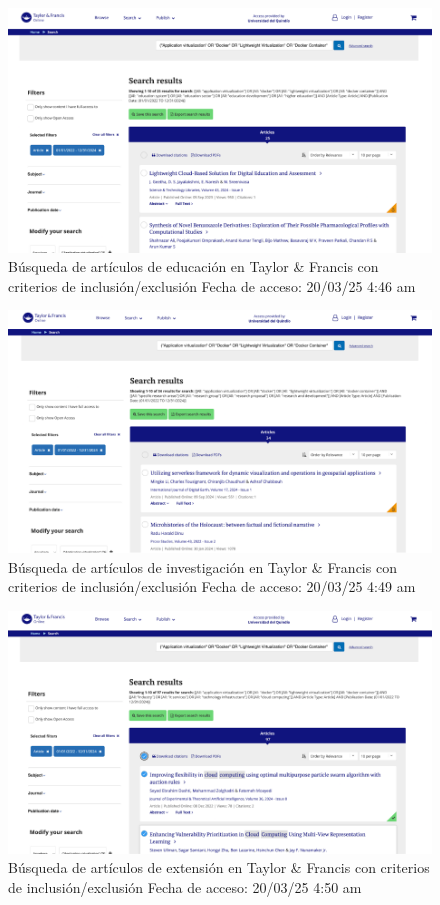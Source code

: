 \FloatBarrier\begin{figure}[H]
    \centering
    \includegraphics[width=\textwidth,keepaspectratio]{apendices/BD/criterios/TF-ed.png}
    \caption{Búsqueda de artículos de educación en Taylor \& Francis con criterios de inclusión/exclusión
    Fecha de acceso: 20/03/25 4:46 am
    }\label{fig:busqueda28}
\end{figure}
\FloatBarrier\begin{figure}[H]
    \centering
    \includegraphics[width=\textwidth,keepaspectratio]{apendices/BD/criterios/TF-inv.png}
    \caption{Búsqueda de artículos de investigación en Taylor \& Francis con criterios de inclusión/exclusión
    Fecha de acceso: 20/03/25 4:49 am
    }\label{fig:busqueda29}
\end{figure}
\FloatBarrier\begin{figure}[H]
    \centering
    \includegraphics[width=\textwidth,keepaspectratio]{apendices/BD/criterios/TF-ind.png}
    \caption{Búsqueda de artículos de extensión en Taylor \& Francis con criterios de inclusión/exclusión
    Fecha de acceso: 20/03/25 4:50 am
    }\label{fig:busqueda30}
\end{figure}
